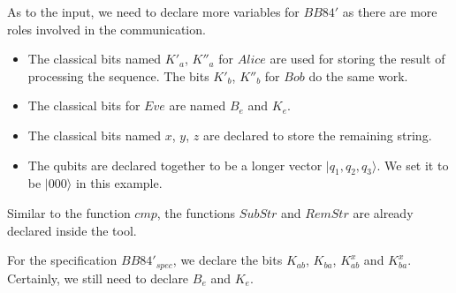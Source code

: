 \documentclass[runningheads]{llncs}
\begin{document}
\smallskip
As to the input, we need to declare more variables for $BB84'$ as there are more roles involved in the communication.
\begin{itemize}
    \item The classical bits named $K'_a$, $K''_a$ for $Alice$ are used for storing the result of processing the sequence. The bits $K'_b$, $K''_b$ for $Bob$ do the same work.
    \item The classical bits for $Eve$ are named $B_e$ and $K_e$.
    \item The classical bits named $x$, $y$, $z$ are declared to store the remaining string.
    \item The qubits are declared together to be a longer vector $|q_1,q_2,q_3\rangle$. We set it to be $|000\rangle$ in this example.
\end{itemize}
Similar to the function $cmp$, the functions $SubStr$ and $RemStr$ are already declared inside the tool. 

For the specification $BB84'_{spec}$, we declare the bits $K_{ab}$, $K_{ba}$, $K^x_{ab}$ and $K^x_{ba}$. Certainly, we still need to declare $B_e$ and $K_e$.


\end{document}
